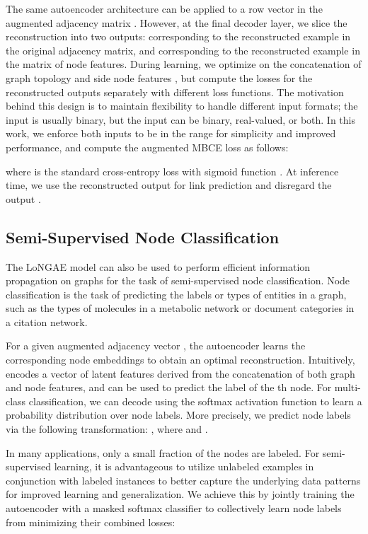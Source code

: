 \documentclass[letterpaper, conference]{IEEEtran}
\begin{document}
The same autoencoder architecture can be applied to a row vector  in the augmented adjacency matrix . However, at the final decoder layer, we slice the reconstruction  into two outputs:  corresponding to the reconstructed example in the original adjacency matrix, and  corresponding to the reconstructed example in the matrix of node features. During learning, we optimize  on the concatenation of graph topology and side node features , but compute the losses for the reconstructed outputs  separately with different loss functions. The motivation behind this design is to maintain flexibility to handle different input formats; the input  is usually binary, but the input  can be binary, real-valued, or both. In this work, we enforce both inputs  to be in the range  for simplicity and improved performance, and compute the augmented MBCE loss as follows:

where  is the standard cross-entropy loss with sigmoid function . At inference time, we use the reconstructed output  for link prediction and disregard the output .

\subsection{Semi-Supervised Node Classification}

The LoNGAE model can also be used to perform efficient information propagation on graphs for the task of semi-supervised node classification. Node classification is the task of predicting the labels or types of entities in a graph, such as the types of molecules in a metabolic network or document categories in a citation network.

For a given augmented adjacency vector , the autoencoder learns the corresponding node embeddings  to obtain an optimal reconstruction. Intuitively,  encodes a vector of latent features derived from the concatenation of both graph and node features, and can be used to predict the label of the th node. For multi-class classification, we can decode  using the softmax activation function to learn a probability distribution over node labels. More precisely, we predict node labels via the following transformation: , where  and .

In many applications, only a small fraction of the nodes are labeled. For semi-supervised learning, it is advantageous to utilize unlabeled examples in conjunction with labeled instances to better capture the underlying data patterns for improved learning and generalization. We achieve this by jointly training the autoencoder with a masked softmax classifier to collectively learn node labels from minimizing their combined losses:
\end{document}
